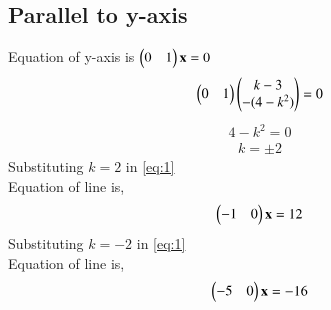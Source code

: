 \documentclass[journal,12pt,twocolumn]{IEEEtran}
\begin{document}
\subsection{Parallel to y-axis}
Equation of y-axis is $\begin{pmatrix}0 & 1\end{pmatrix}\mathbf{x}=0$\\
\begin{align}
  \begin{pmatrix}0 & 1\end{pmatrix}\begin{pmatrix}k-3\\-(4-k^2)\end{pmatrix} =0
\end{align}
\begin{align}
   4-k^2=0
\end{align}
\begin{align}
    k=\pm2
\end{align}
Substituting $k=2$ in \eqref{eq:1}\\
Equation of line is,
\begin{align}
     \begin{pmatrix}-1 & 0\end{pmatrix}\mathbf{x}=12
\end{align}
Substituting $k=-2$ in \eqref{eq:1}\\
Equation of line is,
\begin{align}
  \begin{pmatrix}-5 & 0\end{pmatrix}\mathbf{x}=-16
\end{align}
\end{document}
